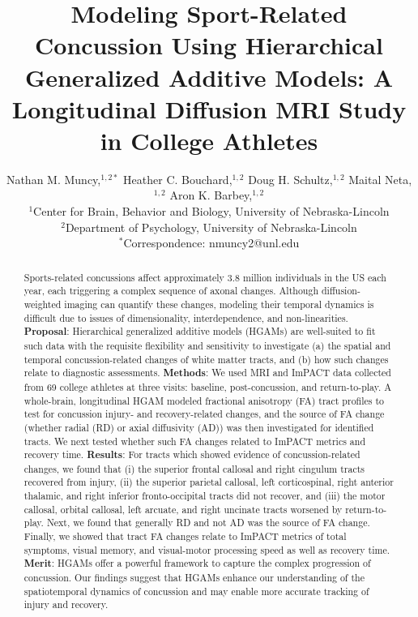 \documentclass[]{imag-ms-template}
\title{Modeling Sport-Related Concussion Using Hierarchical Generalized Additive Models: A Longitudinal Diffusion MRI Study in College Athletes}
\author{Nathan M. Muncy,$^{1,2\ast}$ Heather C. Bouchard,$^{1,2}$  Doug H. Schultz,$^{1,2}$ Maital Neta,$^{1,2}$ Aron K. Barbey,$^{1,2}$\\
{\small $^{1}$Center for Brain, Behavior and Biology, University of Nebraska-Lincoln}\\
{\small $^{2}$Department of Psychology, University of Nebraska-Lincoln}\\
{\small $^\ast$Correspondence:  nmuncy2@unl.edu}
}
\begin{document}
\maketitle



\begin{abstract}
Sports-related concussions affect approximately 3.8 million individuals in the US each year, each triggering a complex sequence of axonal changes. Although diffusion-weighted imaging can quantify these changes, modeling their temporal dynamics is difficult due to issues of dimensionality, interdependence, and non-linearities. \textbf{Proposal}: Hierarchical generalized additive models (HGAMs) are well-suited to fit such data with the requisite flexibility and sensitivity to investigate (a) the spatial and temporal concussion-related changes of white matter tracts, and (b) how such changes relate to diagnostic assessments. \textbf{Methods}: We used MRI and ImPACT data collected from 69 college athletes at three visits: baseline, post-concussion, and return-to-play. A whole-brain, longitudinal HGAM modeled fractional anisotropy (FA) tract profiles to test for concussion injury- and recovery-related changes, and the source of FA change (whether radial (RD) or axial diffusivity (AD)) was then investigated for identified tracts. We next tested whether such FA changes related to ImPACT metrics and recovery time. \textbf{Results}: For tracts which showed evidence of concussion-related changes, we found that (i) the superior frontal callosal and right cingulum tracts recovered from injury, (ii) the superior parietal callosal, left corticospinal, right anterior thalamic, and right inferior fronto-occipital tracts did not recover, and (iii) the motor callosal, orbital callosal, left arcuate, and right uncinate tracts worsened by return-to-play. Next, we found that generally RD and not AD was the source of FA change. Finally, we showed that tract FA changes relate to ImPACT metrics of total symptoms, visual memory, and visual-motor processing speed as well as recovery time. \textbf{Merit}: HGAMs offer a powerful framework to capture the complex progression of concussion. Our findings suggest that HGAMs enhance our understanding of the spatiotemporal dynamics of concussion and may enable more accurate tracking of injury and recovery.
\end{abstract}

\end{document}
